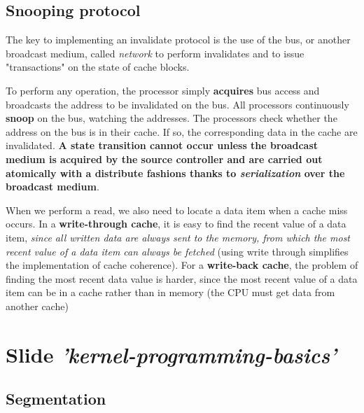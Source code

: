 \documentclass[10pt,a4paper]{article}
\begin{document}
\subsection{Snooping protocol}

The key to implementing an invalidate protocol is the use of the bus, or another broadcast medium, called \textit{network} to perform invalidates and to issue "transactions" on the state of cache blocks.

To perform any operation, the processor simply \textbf{acquires} bus access and broadcasts the address to be invalidated on the bus. All processors continuously \textbf{snoop} on the bus, watching the addresses. The processors check whether the address on the bus is in their cache. If so, the corresponding data in the cache are invalidated. \textbf{A state transition cannot occur unless the broadcast medium is acquired by the source controller and are carried out atomically with a distribute fashions thanks to \textit{serialization} over the broadcast medium}.

When we perform a read, we also need to locate a data item when a cache miss occurs. In a \textbf{write-through cache}, it is easy to find the recent value of a data item, \textit{since all written data are always sent to the memory, from which the most recent value of a data item can always be fetched} (using write through simplifies the implementation of cache coherence). For a \textbf{write-back cache}, the problem of finding the most recent data value is
harder, since the most recent value of a data item can be in a cache rather than in memory (the CPU must get data from another cache)

\newpage
\section{Slide \textit{'kernel-programming-basics'}}

\subsection{Segmentation}
\end{document}
